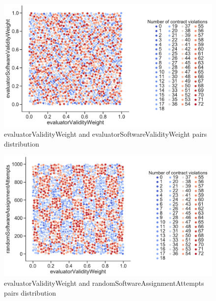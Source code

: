 \begin{figure}
	\centering
	\includegraphics[width=\textwidth]{images/PairsDistr/evaluatorValidityWeight_evaluatorSoftwareValidityWeight.pdf}
	\caption[evaluatorValidityWeight and evaluatorSoftwareValidityWeight pairs distribution]{evaluatorValidityWeight and evaluatorSoftwareValidityWeight pairs distribution}
	\label{fig:evaluatorValidityWeight_evaluatorSoftwareValidityWeight_pair}
\end{figure}
\begin{figure}
	\centering
	\includegraphics[width=\textwidth]{images/PairsDistr/evaluatorValidityWeight_randomSoftwareAssignmentAttempts.pdf}
	\caption[evaluatorValidityWeight and randomSoftwareAssignmentAttempts pairs distribution]{evaluatorValidityWeight and randomSoftwareAssignmentAttempts pairs distribution}
	\label{fig:evaluatorValidityWeight_randomSoftwareAssignmentAttempts_pair}
\end{figure}
